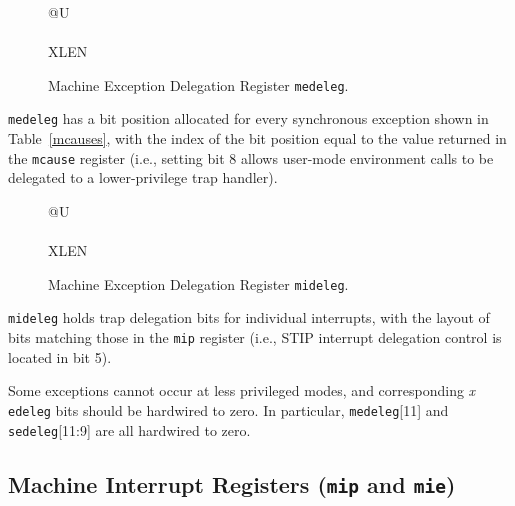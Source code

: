 \begin{figure}[h!]
{\footnotesize
\begin{center}
\begin{tabular}{@{}U}
 \\
\hline
{} \\
\hline
XLEN \\
\end{tabular}
\end{center}
}
\vspace{-0.1in}
\caption{Machine Exception Delegation Register {\tt medeleg}.}
\label{medelegreg}
\end{figure}

{\tt medeleg} has a bit position allocated for every synchronous exception
shown in Table~\ref{mcauses}, with the index of the bit position equal to the
value returned in the {\tt mcause} register (i.e., setting bit 8 allows
user-mode environment calls to be delegated to a lower-privilege trap
handler).

\begin{figure}[h!]
{\footnotesize
\begin{center}
\begin{tabular}{@{}U}
 \\
\hline
{} \\
\hline
XLEN \\
\end{tabular}
\end{center}
}
\vspace{-0.1in}
\caption{Machine Exception Delegation Register {\tt mideleg}.}
\label{midelegreg}
\end{figure}

{\tt mideleg} holds trap delegation bits for individual interrupts, with the
layout of bits matching those in the {\tt mip} register (i.e., STIP interrupt
delegation control is located in bit 5).

Some exceptions cannot occur at less privileged modes, and corresponding
{\em x}\,{\tt edeleg} bits should be hardwired to zero.  In particular,
{\tt medeleg}[11] and {\tt sedeleg}[11:9] are all hardwired to zero.

\subsection{Machine Interrupt Registers ({\tt mip} and {\tt mie})}


